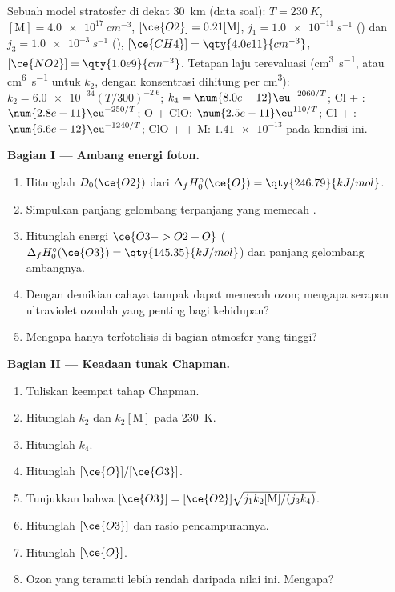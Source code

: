 \begin{problem}
\label{pb:b3:photochemistry:1}
Sebuah model stratosfer di dekat \qty{30}{km} (data soal): $T = \qty{230}{K}$, $[\mathrm M] =
\qty{4.0e17}{cm^{-3}}$, $[\ce{O2}] = 0.21[\mathrm M]$,  $j_1 = \qty{1.0e-11}{s^{-1}}$
() dan $j_3 = \qty{1.0e-3}{s^{-1}}$ (), $[\ce{CH4}] = \qty{4.0e11}{cm^{-3}}$,
$[\ce{NO2}] = \qty{1.0e9}{cm^{-3}}$. Tetapan laju terevaluasi (\unit{cm^3.s^{-1}}, atau
\unit{cm^6.s^{-1}} untuk $k_2$, dengan konsentrasi dihitung per \unit{cm^3}):
$k_2 = \num{6.0e-34}(T/300)^{-2.6}$; $k_4 = \num{8.0e-12}\eu^{-2060/T}$; Cl + : $\num{2.8e-11}\eu^{-250/T}$;
O + ClO: $\num{2.5e-11}\eu^{110/T}$; Cl + : $\num{6.6e-12}\eu^{-1240/T}$; ClO +  + M:
$\num{1.41e-13}$ pada kondisi ini.

\medskip\noindent\textbf{Bagian I --- Ambang energi foton.}
\begin{enumerate}[beginpenalty=10000]
  \item Hitunglah $D_0(\ce{O2})$ dari $\Delta_fH^\circ_0(\ce{O}) = \qty{246.79}{kJ/mol}$.
  \item Simpulkan panjang gelombang terpanjang yang memecah .
  \item Hitunglah energi $\ce{O3 -> O2 + O}$ ($\Delta_fH^\circ_0(\ce{O3}) = \qty{145.35}{kJ/mol}$)
        dan panjang gelombang ambangnya.
  \item Dengan demikian cahaya tampak dapat memecah ozon; mengapa serapan
        ultraviolet ozonlah yang penting bagi kehidupan?
  \item Mengapa  hanya terfotolisis di bagian atmosfer yang tinggi?
\end{enumerate}

\medskip\noindent\textbf{Bagian II --- Keadaan tunak Chapman.}
\begin{enumerate}[resume, beginpenalty=10000]
  \item Tuliskan keempat tahap Chapman.
  \item Hitunglah $k_2$ dan $k_2[\mathrm M]$ pada \qty{230}{K}.
  \item Hitunglah $k_4$.
  \item Hitunglah $[\ce{O}]/[\ce{O3}]$.
  \item Tunjukkan bahwa $[\ce{O3}] = [\ce{O2}]\sqrt{j_1k_2[\mathrm M]/(j_3k_4)}$.
  \item Hitunglah $[\ce{O3}]$ dan rasio pencampurannya.
  \item Hitunglah $[\ce{O}]$.
  \item Ozon yang teramati lebih rendah daripada nilai ini. Mengapa?
\end{enumerate}


\end{problem}
